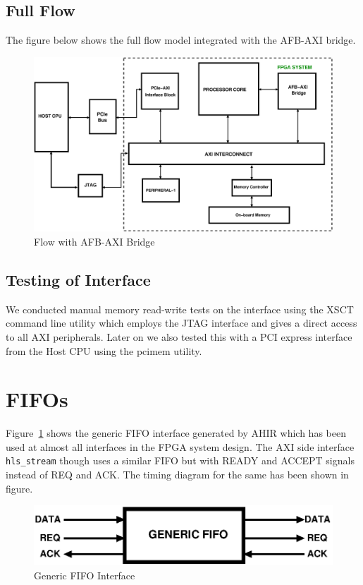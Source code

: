 \subsection{Full Flow}

The figure below shows the full flow model integrated with the AFB-AXI bridge.

\begin{figure}[H]
\centering
\includegraphics[width=\textwidth]{eps_pdf_sources/ajit_fpga/AFB_AXI_bridge/AFB_AXI_bridge_integrated}
\caption{Flow with AFB-AXI Bridge}
\end{figure}

\subsection{Testing of Interface}

We conducted manual memory read-write tests on the interface using the XSCT command line utility which employs the JTAG interface and gives
a direct access to all AXI peripherals. Later on we also tested this with a PCI express interface from the Host CPU using the pcimem
utility.

\section{FIFOs }

Figure~\ref{fifo} shows the generic FIFO interface generated by AHIR which has been used at almost all interfaces in the FPGA system design.
The AXI side interface \verb|hls_stream| though uses a similar FIFO but with READY and ACCEPT signals instead of REQ and ACK. The timing
diagram for the same has been shown in figure.%

\begin{figure}[H]
\centering
\includegraphics[width=\textwidth]{eps_pdf_sources/ajit_fpga/AFB_AXI_bridge/FIFO}
\caption{Generic FIFO Interface}
\label{fifo}
\end{figure}

